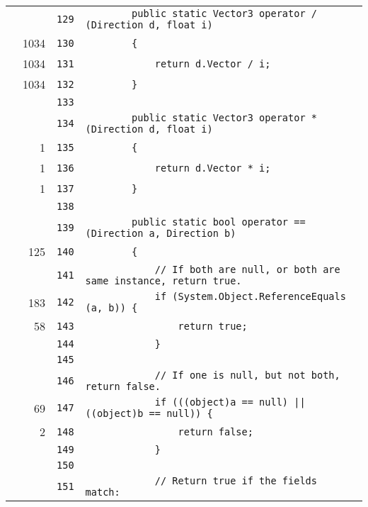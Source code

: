 \documentclass[a4paper,10pt]{article}
\begin{document}
\begin{longtable}[l]{lrrl}
\cellcolor{gray} &  & \verb~129~ & \verb~        public static Vector3 operator / (Direction d, float i)~\\
\cellcolor{green} & 1034 & \verb~130~ & \verb~        {~\\
\cellcolor{green} & 1034 & \verb~131~ & \verb~            return d.Vector / i;~\\
\cellcolor{green} & 1034 & \verb~132~ & \verb~        }~\\
\cellcolor{gray} &  & \verb~133~ & \verb~~\\
\cellcolor{gray} &  & \verb~134~ & \verb~        public static Vector3 operator * (Direction d, float i)~\\
\cellcolor{green} & 1 & \verb~135~ & \verb~        {~\\
\cellcolor{green} & 1 & \verb~136~ & \verb~            return d.Vector * i;~\\
\cellcolor{green} & 1 & \verb~137~ & \verb~        }~\\
\cellcolor{gray} &  & \verb~138~ & \verb~~\\
\cellcolor{gray} &  & \verb~139~ & \verb~        public static bool operator == (Direction a, Direction b)~\\
\cellcolor{green} & 125 & \verb~140~ & \verb~        {~\\
\cellcolor{gray} &  & \verb~141~ & \verb~            // If both are null, or both are same instance, return true.~\\
\cellcolor{green} & 183 & \verb~142~ & \verb~            if (System.Object.ReferenceEquals (a, b)) {~\\
\cellcolor{green} & 58 & \verb~143~ & \verb~                return true;~\\
\cellcolor{gray} &  & \verb~144~ & \verb~            }~\\
\cellcolor{gray} &  & \verb~145~ & \verb~~\\
\cellcolor{gray} &  & \verb~146~ & \verb~            // If one is null, but not both, return false.~\\
\cellcolor{green} & 69 & \verb~147~ & \verb~            if (((object)a == null) || ((object)b == null)) {~\\
\cellcolor{green} & 2 & \verb~148~ & \verb~                return false;~\\
\cellcolor{gray} &  & \verb~149~ & \verb~            }~\\
\cellcolor{gray} &  & \verb~150~ & \verb~~\\
\cellcolor{gray} &  & \verb~151~ & \verb~            // Return true if the fields match:~\\

\end{longtable}
\end{document}
